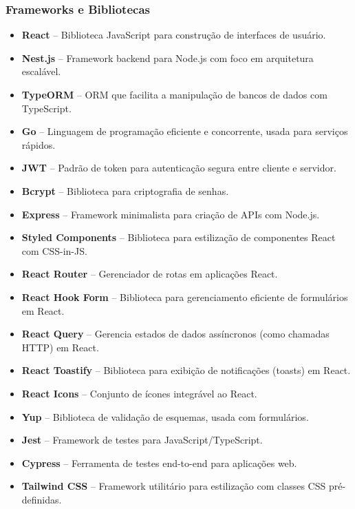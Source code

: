 \documentclass[12pt, a4paper]{article}
\begin{document}
\begin{spacing}{1.5}
\subsubsection{Frameworks e Bibliotecas}
\begin{itemize}
\item \textbf{React} – Biblioteca JavaScript para construção de interfaces de usuário.
\item \textbf{Nest.js} – Framework backend para Node.js com foco em arquitetura escalável.
\item \textbf{TypeORM} – ORM que facilita a manipulação de bancos de dados com TypeScript.
\item \textbf{Go} – Linguagem de programação eficiente e concorrente, usada para serviços rápidos.
\item \textbf{JWT} – Padrão de token para autenticação segura entre cliente e servidor.
\item \textbf{Bcrypt} – Biblioteca para criptografia de senhas.
\item \textbf{Express} – Framework minimalista para criação de APIs com Node.js.
\item \textbf{Styled Components} – Biblioteca para estilização de componentes React com CSS-in-JS.
\item \textbf{React Router} – Gerenciador de rotas em aplicações React.
\item \textbf{React Hook Form} – Biblioteca para gerenciamento eficiente de formulários em React.
\item \textbf{React Query} – Gerencia estados de dados assíncronos (como chamadas HTTP) em React.
\item \textbf{React Toastify} – Biblioteca para exibição de notificações (toasts) em React.
\item \textbf{React Icons} – Conjunto de ícones integrável ao React.
\item \textbf{Yup} – Biblioteca de validação de esquemas, usada com formulários.
\item \textbf{Jest} – Framework de testes para JavaScript/TypeScript.
\item \textbf{Cypress} – Ferramenta de testes end-to-end para aplicações web.
\item \textbf{Tailwind CSS} – Framework utilitário para estilização com classes CSS pré-definidas.
\end{itemize}


\end{spacing}
\end{document}
